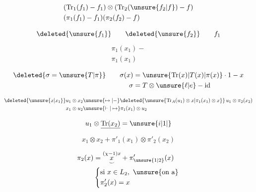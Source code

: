 \[
\begin{aligned}
&(\mathrm{Tr}_1(f_1)-f_1)\otimes(\mathrm{Tr}_2(\unsure{f_2|f})-f)\\
&(\pi_1(f_1)-f_1)(\pi_2(f_2)-f)
\end{aligned}
\]

\[
\deleted{\unsure{f_1}}\qquad\deleted{\unsure{f_2}}\qquad f_1
\]
\[
\begin{aligned}\pi_1(x_1)-\\ \pi_1(x_1)\end{aligned}
\]

\[
\begin{aligned}
\deleted{\sigma=\unsure{T|\pi}}\qquad \sigma(x)&=\unsure{\mathrm{Tr}(x)|T(x)|\pi(x)}\cdot1-x\\
\sigma&=T\otimes\unsure{\ell|e}-\mathrm{id}
\end{aligned}
\]


\[
\begin{aligned}
\deleted{\unsure{x|x_1}}u_1\otimes x_2&\unsure{\mapsto|\mathbin{-}}\deleted{\unsure{\mathrm{Tr}_{A}(u_1)\otimes x|\pi_1(x_1)\otimes x}}\,u_1\otimes\pi_2(x_2)\\
x_1\otimes u_2&\unsure{\mathrel{\vdash}|\mapsto}\pi_1(x_1)\otimes u_2
\end{aligned}
\]

\[u_1\otimes\underline{\mathrm{Tr}(x_2)}=\unsure{i|1|}\]

\[\boxed{x_1\otimes x_2+\pi'_1(x_1)\otimes\pi'_2(x_2)}\]

\[
\begin{aligned}
\pi_2(x)&=\overset{(\chi-1)x}{\underset{\smile}{x}}+\pi'_{\unsure{1|2}}(x)\\
&\left\{\begin{aligned}&\text{si }x\in L_2,\ \unsure{\text{on a}}\\&\pi'_2(x)=x\end{aligned}\right.
\end{aligned}
\]
